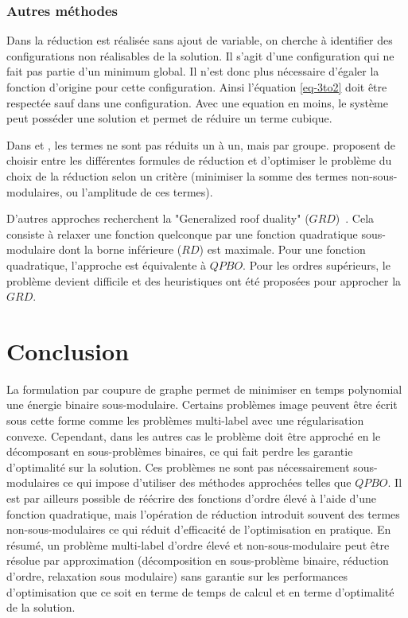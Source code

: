 \documentclass[../main/These_Mathias_Paget.tex]{subfiles}
\begin{document}
\subsubsection{Autres méthodes}
	Dans \cite{Ishikawa14CVPR} la réduction est réalisée sans ajout de variable, on cherche à identifier des configurations non réalisables de la solution. Il s'agit d'une configuration qui ne fait pas partie d'un minimum global. Il n'est donc plus nécessaire d’égaler la fonction d'origine pour cette configuration. Ainsi l'équation \ref{eq-3to2} doit être respectée sauf dans une configuration. Avec une equation en moins, le système peut posséder une solution et permet de réduire un terme cubique.
	
	Dans \cite{Fix11ICCV} et \cite{Boros2014}, les termes ne sont pas réduits un à un, mais par groupe. \cite{Gallagher11CVPR} proposent de choisir entre les différentes formules de réduction et d'optimiser le problème du choix de la réduction selon un critère (minimiser la somme des termes non-sous-modulaires, ou l'amplitude de ces termes).
	
	D'autres approches recherchent la "Generalized roof duality" ($GRD$)~\cite{Kahl12DAM}. Cela consiste à relaxer une fonction quelconque par une fonction quadratique sous-modulaire dont la borne inférieure ($RD$) est maximale. Pour une fonction quadratique, l’approche est équivalente à $QPBO$. Pour les ordres supérieurs, le problème devient difficile et des heuristiques ont été proposées pour approcher la $GRD$.

\section{Conclusion}
	La formulation par coupure de graphe permet de minimiser en temps polynomial une énergie binaire sous-modulaire. Certains problèmes image peuvent être écrit sous cette forme comme  les problèmes multi-label avec une régularisation convexe. Cependant, dans les autres cas le problème doit être approché en le décomposant en sous-problèmes binaires, ce qui fait perdre les garantie d'optimalité sur la solution. Ces problèmes ne sont pas nécessairement sous-modulaires ce qui impose d'utiliser des méthodes approchées telles que $QPBO$. Il est par ailleurs possible de réécrire des fonctions d'ordre élevé à l'aide d'une fonction quadratique, mais l'opération de réduction introduit souvent des termes non-sous-modulaires ce qui réduit d'efficacité de l'optimisation en pratique. En résumé, un problème multi-label d'ordre élevé et non-sous-modulaire peut être résolue par approximation (décomposition en sous-problème binaire, réduction d'ordre, relaxation sous modulaire) sans garantie sur les performances d'optimisation que ce soit en terme de temps de calcul et en terme d'optimalité de la solution.

%



\end{document}
